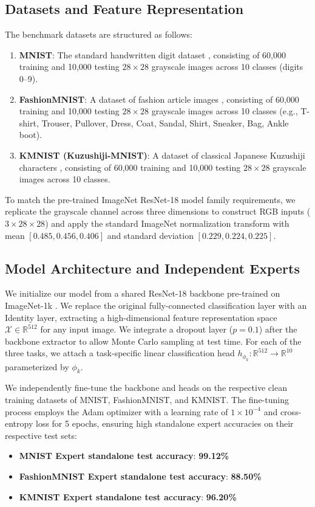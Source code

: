\documentclass{article}
\theoremstyle{plain}
\theoremstyle{definition}
\theoremstyle{remark}
\begin{document}
\subsection{Datasets and Feature Representation}
The benchmark datasets are structured as follows:
\begin{enumerate}
  \item \textbf{MNIST}: The standard handwritten digit dataset \cite{lecun1998gradient}, consisting of 60,000 training and 10,000 testing $28\times 28$ grayscale images across 10 classes (digits 0--9).
  \item \textbf{FashionMNIST}: A dataset of fashion article images \cite{xiao2017fashion}, consisting of 60,000 training and 10,000 testing $28\times 28$ grayscale images across 10 classes (e.g., T-shirt, Trouser, Pullover, Dress, Coat, Sandal, Shirt, Sneaker, Bag, Ankle boot).
  \item \textbf{KMNIST (Kuzushiji-MNIST)}: A dataset of classical Japanese Kuzushiji characters \cite{clanuwat2018deep}, consisting of 60,000 training and 10,000 testing $28\times 28$ grayscale images across 10 classes.
\end{enumerate}
To match the pre-trained ImageNet ResNet-18 model family requirements, we replicate the grayscale channel across three dimensions to construct RGB inputs ($3\times 28\times 28$) and apply the standard ImageNet normalization transform with mean $[0.485, 0.456, 0.406]$ and standard deviation $[0.229, 0.224, 0.225]$.

\subsection{Model Architecture and Independent Experts}
We initialize our model from a shared ResNet-18 backbone pre-trained on ImageNet-1k \cite{he2016deep}. We replace the original fully-connected classification layer with an Identity layer, extracting a high-dimensional feature representation space $\mathcal{X} \in \mathbb{R}^{512}$ for any input image. We integrate a dropout layer ($p=0.1$) after the backbone extractor to allow Monte Carlo sampling at test time.
For each of the three tasks, we attach a task-specific linear classification head $h_{\phi_k}: \mathbb{R}^{512} \to \mathbb{R}^{10}$ parameterized by $\phi_k$. 

We independently fine-tune the backbone and heads on the respective clean training datasets of MNIST, FashionMNIST, and KMNIST. The fine-tuning process employs the Adam optimizer with a learning rate of $1\times 10^{-4}$ and cross-entropy loss for 5 epochs, ensuring high standalone expert accuracies on their respective test sets:
\begin{itemize}
  \item \textbf{MNIST Expert standalone test accuracy}: \textbf{99.12\%}
  \item \textbf{FashionMNIST Expert standalone test accuracy}: \textbf{88.50\%}
  \item \textbf{KMNIST Expert standalone test accuracy}: \textbf{96.20\%}
\end{itemize}
\end{document}
